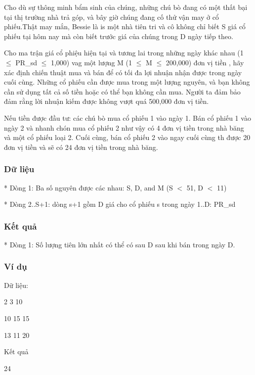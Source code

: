 



   Cho dù sự thông minh bẩm sinh của chúng, những chú bò đang có một thất  bại tại thị trường nhà trả góp, và bây giờ chúng đang cố thử vận may ở  cổ phiếu.Thật may mắn, Bessie là is một nhà tiên tri và cô không chỉ biết  S giá cổ phiếu tại hôm nay mà còn biết trước giá của chúng trong D ngày  tiếp theo.  

   Cho ma trận giá cổ phiệu hiện tại và tương lai trong những ngày khác nhau  (1  $\le$  PR\_sd  $\le$  1,000) vag một lượng M (1  $\le$  M  $\le$  200,000) đơn vị tiền , hãy xác định chiến thuật mua và bán để có tối đa lợi nhuận nhận được trong  ngày cuối cùng. Những cổ phiếu cần được mua trong một lượng nguyên, và bạn  không cần sử dụng tất cả số tiền hoặc có thể bạn không cần mua. Người ta  đảm bảo đảm rằng lời nhuận kiếm được không vượt quá 500,000 đơn vị tiền.  

   Nếu tiền được đầu tư: các chú bò mua cổ phiếu 1 vào ngày 1. Bán cổ phiếu  1 vào ngày 2 và nhanh chón mua cổ phiếu 2 như vậy có 4 đơn vị tiền trong  nhà băng và một cổ phiếu loại 2. Cuối cùng, bán cổ phiếu 2 vào ngay cuối  cùng th được 20 đơn vị tiền và sẽ có 24 đơn vị tiền trong nhà băng.  

\subsubsection{   Dữ liệu  }

   * Dòng 1: Ba số nguyên được các nhau: S, D, and M (S $<$ 51, D $<$ 11)  

   * Dòng 2..S+1: dòng s+1 gồm D giá cho cổ phiếu s trong ngày 1..D: PR\_sd  

\subsubsection{   Kết quả  }

   * Dòng 1: Số lượng tiên lớn nhất có thể có sau D sau khi bán trong ngày D.  

\subsubsection{   Ví dụ  }

   Dữ liệu:  

   2 3 10   


   10 15 15   


   13 11 20  



   Kết quả  

   24  
